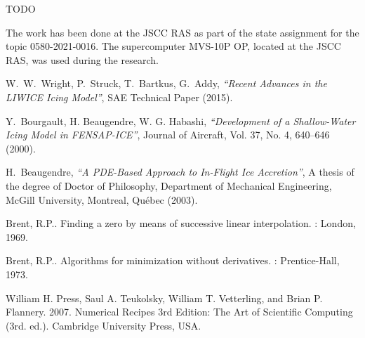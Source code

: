 \documentclass[
11pt,%
tightenlines,%
twoside,%
onecolumn,%
nofloats,%
nobibnotes,%
nofootinbib,%
superscriptaddress,%
noshowpacs,%
centertags]%
{revtex4}
\begin{document}
TODO

\begin{acknowledgments}
The work has been done at the JSCC RAS as part of the state assignment for the topic 0580-2021-0016.
The supercomputer MVS-10P OP, located at the JSCC RAS, was used during the research.
\end{acknowledgments}

\begin{thebibliography}{99}

W.~W.~Wright, P.~Struck, T.~Bartkus, G.~Addy, {\it ``Recent Advances in the LIWICE Icing Model''}, SAE Technical Paper (2015).

Y.~Bourgault, H. Beaugendre, W. G. Habashi, {\it ``Development of a Shallow-Water Icing Model in FENSAP-ICE''}, Journal of Aircraft, Vol. 37, No. 4, 640--646 (2000).

H.~Beaugendre, {\it ``A PDE-Based Approach to In-Flight Ice Accretion''}, A thesis of the degree of Doctor of Philosophy, Department of Mechanical Engineering, McGill University, Montreal, Qu\'ebec (2003).

Brent, R.P.. Finding a zero by means of successive linear interpolation. : London, 1969.

Brent, R.P.. Algorithms for minimization without derivatives. : Prentice-Hall, 1973.

William H. Press, Saul A. Teukolsky, William T. Vetterling, and Brian P. Flannery. 2007. Numerical Recipes 3rd Edition: The Art of Scientific Computing (3rd. ed.). Cambridge University Press, USA.


\end{thebibliography}
\end{document}
